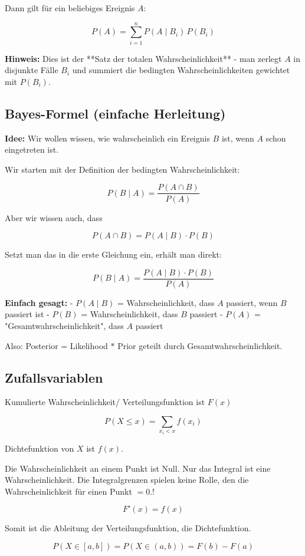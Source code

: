 \documentclass[a4paper]{article}
\begin{document}
Dann gilt für ein beliebiges Ereignis $A$:

\[
P(A) = \sum_{i=1}^{n} P(A \mid B_i)\, P(B_i)
\]

\textbf{Hinweis:}  
Dies ist der **Satz der totalen Wahrscheinlichkeit** - man zerlegt $A$ in disjunkte Fälle $B_i$ und summiert die bedingten Wahrscheinlichkeiten gewichtet mit $P(B_i)$.

\subsection{Bayes-Formel (einfache Herleitung)}

\textbf{Idee:} Wir wollen wissen, wie wahrscheinlich ein Ereignis $B$ ist, wenn $A$ schon eingetreten ist.  

Wir starten mit der Definition der bedingten Wahrscheinlichkeit:

\[
P(B \mid A) = \frac{P(A \cap B)}{P(A)}
\]

Aber wir wissen auch, dass

\[
P(A \cap B) = P(A \mid B) \cdot P(B)
\]

Setzt man das in die erste Gleichung ein, erhält man direkt:

\[
\boxed{
P(B \mid A) = \frac{P(A \mid B) \cdot P(B)}{P(A)}
}
\]

\textbf{Einfach gesagt:}  
- \(P(A \mid B)\) = Wahrscheinlichkeit, dass $A$ passiert, wenn $B$ passiert ist  
- \(P(B)\) = Wahrscheinlichkeit, dass $B$ passiert  
- \(P(A)\) = "Gesamtwahrscheinlichkeit", dass $A$ passiert  

Also: Posterior = Likelihood $*$ Prior geteilt durch Gesamtwahrscheinlichkeit.

\subsection{Zufallsvariablen}

Kumulierte Wahrscheinlichkeit/ Verteilungsfunktion ist $F(x)$

\[
P(X \leq x) = \sum_{x_i < x} f(x_i)
\]

Dichtefunktion von $X$ ist $f(x)$.

Die Wahrscheinlichkeit an einem Punkt ist Null. Nur das Integral ist eine Wahrscheinlichkeit. Die Integralgrenzen spielen keine Rolle, den die Wahrscheinlichkeit für einen Punkt $=0$.!

\[
F'(x) = f(x)
\]

Somit ist die Ableitung der Verteilungsfunktion, die Dichtefunktion.

\[
P( X \in [a, b]) = P( X \in (a, b))= F(b) - F(a)
\]

\end{document}
